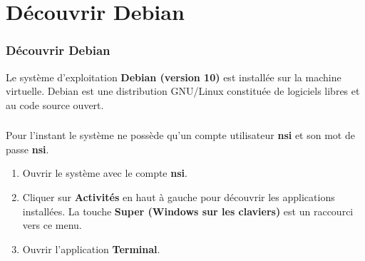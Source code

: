 \documentclass[svgnames,11pt]{beamer}
\begin{document}
\section{Découvrir Debian}
\begin{frame}
    \frametitle{Découvrir Debian}
    Le système d'exploitation \textbf{Debian (version 10)} est installée sur la machine virtuelle. Debian est une distribution GNU/Linux constituée de logiciels libres et au code source ouvert.
    

\end{frame}
\begin{frame}
    \frametitle{}

    Pour l'instant le système ne possède qu'un compte utilisateur \textbf{nsi} et son mot de passe \textbf{nsi}.
\begin{activite}
    \begin{enumerate}
        \item Ouvrir le système avec le compte \textbf{nsi}.
        \item Cliquer sur \textbf{Activités} en haut à gauche pour découvrir les applications installées. La touche \textbf{Super (Windows sur les claviers)} est un raccourci vers ce menu.
        \item Ouvrir l'application \textbf{Terminal}.
    \end{enumerate}
\end{activite}

\end{frame}
\end{document}
